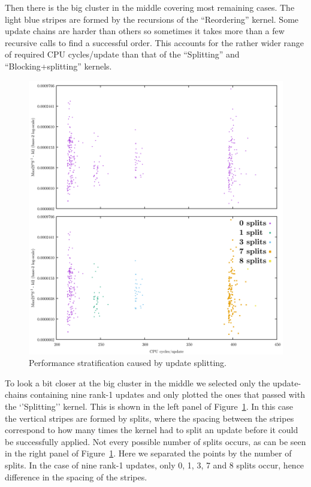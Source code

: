 \documentclass[11pt]{article}
\numberwithin{figure}{section}
\numberwithin{table}{section}
\begin{document}
		Then there is the big cluster in the middle covering most remaining cases. The light blue stripes are formed by the recursions of the ``Reordering'' kernel. Some update chains are harder than others so sometimes it takes  more than a few recursive calls to find a successful order. This accounts for the rather wider range of required CPU cycles/update than that of the ``Splitting'' and ``Blocking+splitting'' kernels.
		\begin{figure}[H]
		  \centering
		  \includegraphics[width=\linewidth]{stratification.png}	
		  \caption{Performance stratification caused by update splitting.}
		  \label{fig:stratification}
		\end{figure}
		To look a bit closer at the big cluster in the middle we selected only the update-chains containing nine rank-1 updates and only plotted the ones that passed with the `'Splitting'' kernel. This is shown in the left panel of Figure~\ref{fig:stratification}. In this case the vertical stripes are formed by splits, where the spacing between the stripes correspond to how many times the kernel had to split an update before it could be successfully applied. Not every possible number of splits occurs, as can be seen in the right panel of Figure~\ref{fig:stratification}. Here we separated the points by the number of splits. In the case of nine rank-1 updates, only 0, 1, 3, 7 and 8 splits occur, hence difference in the spacing of the stripes.
\end{document}
